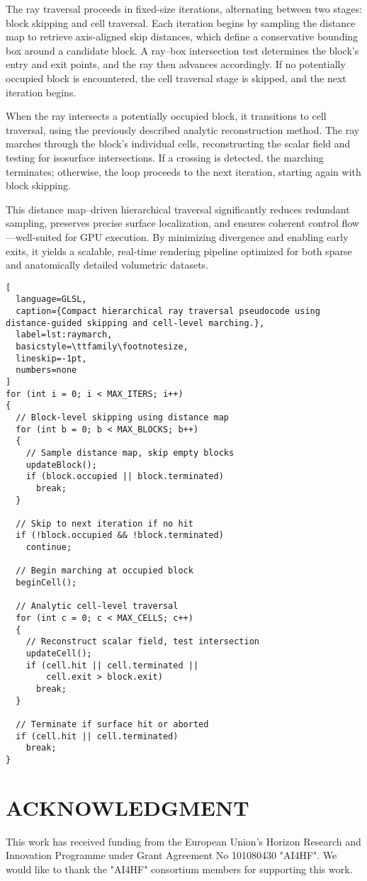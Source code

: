 \documentclass[conference]{IEEEtran}
\begin{document}
The ray traversal proceeds in fixed-size iterations, alternating between two stages: block skipping and cell traversal. Each iteration begins by sampling the distance map to retrieve axis-aligned skip distances, which define a conservative bounding box around a candidate block. A ray–box intersection test determines the block's entry and exit points, and the ray then advances accordingly. If no potentially occupied block is encountered, the cell traversal stage is skipped, and the next iteration begins.

When the ray intersects a potentially occupied block, it transitions to cell traversal, using the previously described analytic reconstruction method. The ray marches through the block’s individual cells, reconstructing the scalar field and testing for isosurface intersections. If a crossing is detected, the marching terminates; otherwise, the loop proceeds to the next iteration, starting again with block skipping.

This distance map–driven hierarchical traversal significantly reduces redundant sampling, preserves precise surface localization, and ensures coherent control flow—well-suited for GPU execution. By minimizing divergence and enabling early exits, it yields a scalable, real-time rendering pipeline optimized for both sparse and anatomically detailed volumetric datasets.

\begin{lstlisting}[
  language=GLSL,
  caption={Compact hierarchical ray traversal pseudocode using distance-guided skipping and cell-level marching.},
  label=lst:raymarch,
  basicstyle=\ttfamily\footnotesize,
  lineskip=-1pt,
  numbers=none
]
for (int i = 0; i < MAX_ITERS; i++) 
{
  // Block-level skipping using distance map
  for (int b = 0; b < MAX_BLOCKS; b++) 
  {
    // Sample distance map, skip empty blocks
    updateBlock();  
    if (block.occupied || block.terminated)
      break;
  }

  // Skip to next iteration if no hit
  if (!block.occupied && !block.terminated)
    continue;

  // Begin marching at occupied block
  beginCell();

  // Analytic cell-level traversal
  for (int c = 0; c < MAX_CELLS; c++) 
  {
    // Reconstruct scalar field, test intersection
    updateCell();  
    if (cell.hit || cell.terminated || 
        cell.exit > block.exit)
      break;
  }

  // Terminate if surface hit or aborted
  if (cell.hit || cell.terminated)
    break;
}
\end{lstlisting}

\section*{ACKNOWLEDGMENT}

This work has received funding from the European Union's Horizon Research and Innovation Programme under Grant Agreement No 101080430 "AI4HF". We would like to thank the "AI4HF" consortium members for supporting this work. 



\end{document}
